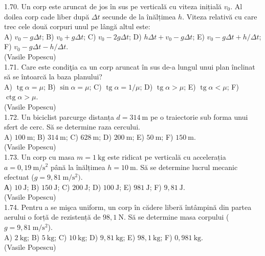 1.70. Un corp este aruncat de jos în sus pe verticală cu viteza inițială $v_{0}$. Al doilea corp cade liber după $\Delta t$ secunde de la înălțimea $h$. Viteza relativă cu care trec cele două corpuri unul pe lângă altul este:\\ A) $v_{0}-g \Delta t$; B) $v_{0}+g \Delta t$; C) $v_{0}-2 g \Delta t$; D) $h \Delta t+v_{0}-g \Delta t$; E) $v_{0}-g \Delta t+h / \Delta t$; F) $v_{0}-g \Delta t-h / \Delta t$.\\ (Vasile Popescu)\\

1.71. Care este condiţia ca un corp aruncat în sus de-a lungul unui plan înclinat să se întoarcă la baza planului?\\ A) $\operatorname{tg} \alpha=\mu$; B) $\sin \alpha=\mu$; C) $\operatorname{tg} \alpha=1 / \mu$; D) $\operatorname{tg} \alpha>\mu$; E) $\operatorname{tg} \alpha<\mu$; F) $\operatorname{ctg} \alpha>\mu$.\\ (Vasile Popescu)\\

1.72. Un biciclist parcurge distanța $d=314 \mathrm{~m}$ pe o traiectorie sub forma unui sfert de cerc. Să se determine raza cercului.\\ A) $100 \mathrm{~m}$; B) $314 \mathrm{~m}$; C) $628 \mathrm{~m}$; D) $200 \mathrm{~m}$; E) $50 \mathrm{~m}$; F) $150 \mathrm{~m}$.\\ (Vasile Popescu)\\

1.73. Un corp cu masa $m=1 \mathrm{~kg}$ este ridicat pe verticală cu accelerația $a=0,19 \mathrm{~m} / \mathrm{s}^{2}$ până la înălțimea $h=10 \mathrm{~m}$. Să se determine lucrul mecanic efectuat ($g=9,81 \mathrm{~m} / \mathrm{s}^{2})$.\\ А) $10 \mathrm{~J}$; B) $150 \mathrm{~J}$; C) $200 \mathrm{~J}$; D) $100 \mathrm{~J}$; E) $981 \mathrm{~J}$; F) $9,81 \mathrm{~J}$.\\ (Vasile Popescu)\\

1.74. Pentru a se mişca uniform, un corp în cădere liberă întâmpină din partea aerului o forță de rezistență de $98,1 \mathrm{~N}$. Să se determine masa corpului ($g=9,81 \mathrm{~m} / \mathrm{s}^{2}$).\\ A) $2 \mathrm{~kg}$; B) $5 \mathrm{~kg}$; C) $10 \mathrm{~kg}$; D) $9,81 \mathrm{~kg}$; E) $98,1 \mathrm{~kg}$; F) $0,981 \mathrm{~kg}$.\\ (Vasile Popescu)\\

